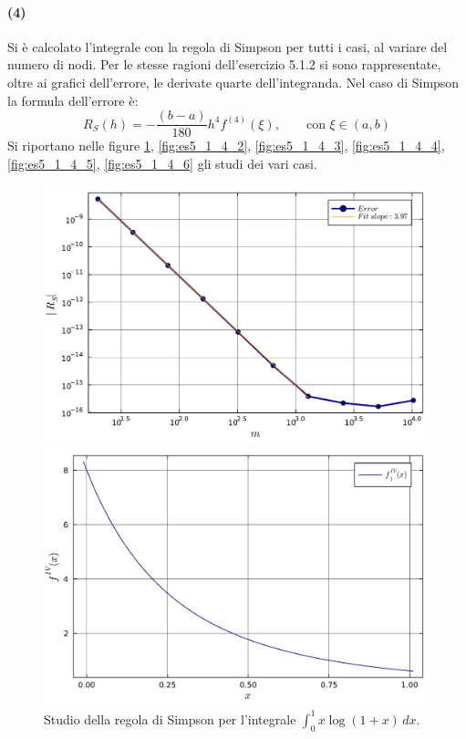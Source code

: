 \documentclass[letterpaper, 12pt]{article}
\numberwithin{equation}{section}    %
\begin{document}
\paragraph{(4)}Si è calcolato l'integrale con la regola di Simpson per tutti i casi, al variare del numero di
nodi. Per le stesse ragioni dell'esercizio 5.1.2 si sono rappresentate, oltre ai grafici dell'errore, 
le derivate quarte dell'integranda. Nel caso di Simpson la formula dell'errore è:
\[
R_S(h) = -\frac{(b-a)}{180}h^4 f^{(4)}(\xi), \qquad \text{con } \xi \in (a, b)
\] 
Si riportano nelle figure \ref{fig:es5_1_4_1}, \ref{fig:es5_1_4_2}, \ref{fig:es5_1_4_3},
\ref{fig:es5_1_4_4}, \ref{fig:es5_1_4_5}, \ref{fig:es5_1_4_6} gli studi dei vari casi.
\begin{figure}[!ht]
    \centering
    \begin{minipage}[b]{0.47\textwidth}
        \includegraphics[width=\textwidth]{5141.pdf}
    \end{minipage}
    \hspace{0.5cm}
    \begin{minipage}[b]{0.47\textwidth}
        \includegraphics[width=\textwidth]{5141_2.pdf}
    \end{minipage}
    \caption{Studio della regola di Simpson per l'integrale $\int_0^1 x\log(1+x)\, dx$.}
    \label{fig:es5_1_4_1}
\end{figure}
\end{document}
